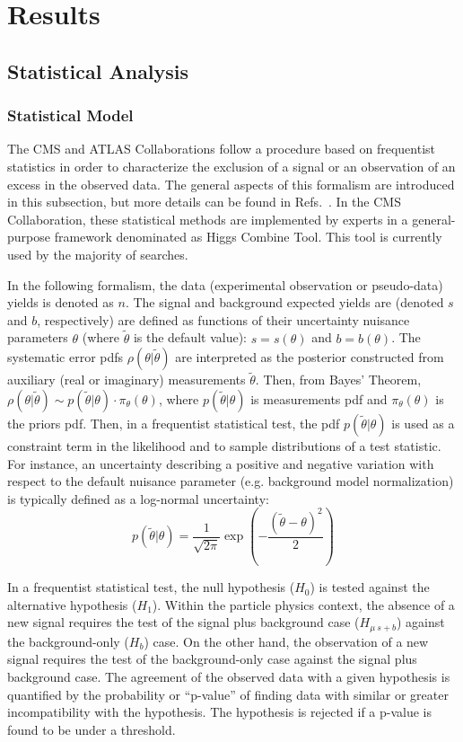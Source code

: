 \chapter{Results} 
\label{chapter:results}
\section{Statistical Analysis}
\subsection{Statistical Model} \label{results:statmodel}
The CMS and ATLAS Collaborations follow a procedure based on frequentist statistics in order to characterize the exclusion of a signal or an observation of an excess in the observed data. The general aspects of this formalism are introduced in this subsection, but more details can be found in Refs.~\cite{ATLAS:2011tau,Cowan:2010js}. In the CMS Collaboration, these statistical methods are implemented by experts in a general-purpose framework denominated as Higgs Combine Tool. This tool is currently used by the majority of searches.

In the following formalism, the data (experimental observation or pseudo-data) yields is denoted as $n$. The signal and background expected yields are (denoted $s$ and $b$, respectively) are defined as functions of their uncertainty nuisance parameters $\theta$ (where $\tilde{\theta}$ is the default value): $s=s(\theta)$ and $b=b(\theta)$.  The systematic error pdfs $\rho(\theta|\tilde{\theta})$ are interpreted as the posterior constructed from auxiliary (real or imaginary) measurements $\tilde{\theta}$. Then, from Bayes' Theorem, $\rho(\theta|\tilde{\theta})\sim p(\tilde{\theta}|\theta) \cdot \pi_{\theta}(\theta)$, where  $p(\tilde{\theta}|\theta)$ is measurements pdf and $\pi_{\theta}(\theta)$ is the priors pdf. Then, in a frequentist statistical test, the pdf $p(\tilde{\theta}|\theta)$ is used as a constraint term in the likelihood and to sample distributions of a test statistic. For instance, an uncertainty describing a positive and negative variation with respect to the default nuisance parameter (e.g. background model normalization) is typically defined as a log-normal uncertainty:
\begin{equation}
    p(\tilde{\theta}|\theta)=\frac{1}{\sqrt{2\pi}} \exp{ \left( - \frac{ (\tilde{\theta}-\theta)^{2} }{2} \right)   }
\end{equation}

In a frequentist statistical test, the null hypothesis ($H_{0}$) is tested against the alternative hypothesis ($H_{1}$). Within the particle physics context, the absence of a new signal requires the test of the signal plus background case ($H_{\mu~s+b}$) against the background-only ($H_{b}$) case.  On the other hand, the observation of a new signal requires the test of the background-only case against the signal plus background case. The agreement of the observed data with a given hypothesis is quantified by the probability or ``p-value'' of finding data with similar or greater incompatibility with the hypothesis. The hypothesis is rejected if a p-value is found to be under a threshold. 

